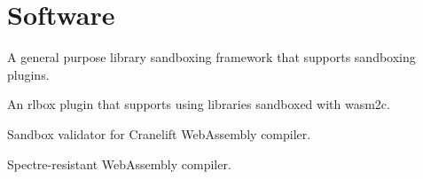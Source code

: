 \section{Software}


{A general purpose library sandboxing framework that supports sandboxing plugins.}

{An rlbox plugin that supports using libraries sandboxed with wasm2c.}

{Sandbox validator for Cranelift WebAssembly compiler.}

{Spectre-resistant WebAssembly compiler.}
